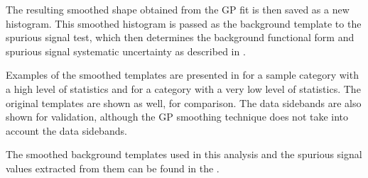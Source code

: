The resulting smoothed shape obtained from the GP fit is then saved as a new histogram. This
smoothed histogram is passed as the background template to the spurious signal test, which then
determines the background functional form and spurious signal systematic uncertainty as described
in \Sect{\ref{ssec:spurious_signal}}.

Examples of the smoothed templates are presented in \Fig{\ref{fig:exampleGPR}} for a sample category with a high
level of statistics and for a category with a very low level of statistics.
The original templates are shown as well, for comparison. The data sidebands are also shown for
validation, although the GP smoothing technique does not take into account the data sidebands.

The smoothed background templates used in this analysis and the spurious signal values extracted from them can be found in the \App{\ref{sec:GPR_templates}}.

